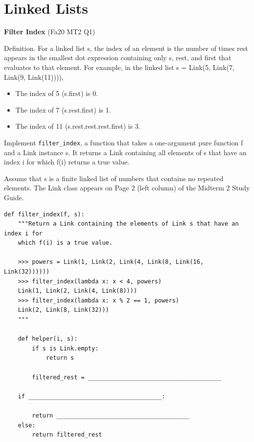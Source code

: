 \documentclass{exam}
\newlength{\currentparskip}
\newenvironment{blocksection}
{
    \setlength{\currentparskip}{\parskip}%
    \begin{minipage}{\linewidth}
    \setlength{\parskip}{\currentparskip}%
}
{
    \end{minipage}
}
\begin{document}
\section{Linked Lists}
\begin{questions}

\begin{blocksection}
\question \textbf{Filter Index} (Fa20 MT2 Q1)

    Definition. For a linked list s, the index of an element is the number of times rest appears in the smallest
    dot expression containing only s, rest, and first that evaluates to that element. For example, in the
    linked list s = Link(5, Link(7, Link(9, Link(11)))),
    
    \begin{itemize}
        \item The index of 5 (s.first) is 0.
        \item The index of 7 (s.rest.first) is 1.
        \item The index of 11 (s.rest.rest.rest.first) is 3.
    \end{itemize}
    
    Implement \lstinline{filter_index}, a function that takes a one-argument pure function f and a Link instance s. It
    returns a Link containing all elements of s that have an index i for which f(i) returns a true value.
    
    Assume that s is a finite linked list of numbers that contains no repeated elements. The Link class appears
    on Page 2 (left column) of the Midterm 2 Study Guide.
\begin{lstlisting}
def filter_index(f, s):
    """Return a Link containing the elements of Link s that have an index i for
    which f(i) is a true value.
    
    >>> powers = Link(1, Link(2, Link(4, Link(8, Link(16, Link(32))))))
    >>> filter_index(lambda x: x < 4, powers)
    Link(1, Link(2, Link(4, Link(8))))
    >>> filter_index(lambda x: x % 2 == 1, powers)
    Link(2, Link(8, Link(32)))
    """
    
    def helper(i, s):
        if s is Link.empty:
            return s

        filtered_rest = ______________________________________

    if ______________________________________:

        return ______________________________________
    else:
        return filtered_rest


\end{lstlisting}
\end{blocksection}
\end{questions}
\end{document}
